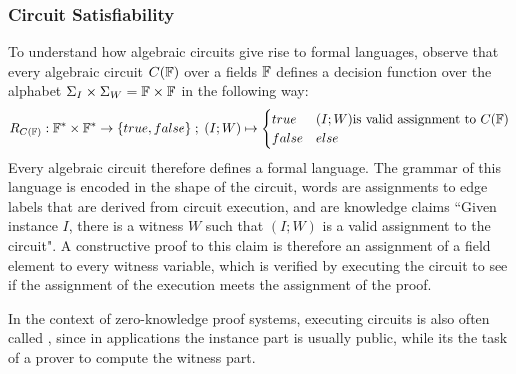 \subsubsection{Circuit Satisfiability}
\label{circuit-satisfiability} To understand how algebraic circuits give rise to formal languages, observe that every algebraic circuit $C(\mathbb{F})$ over a fields $\mathbb{F}$ defines a decision function over the alphabet $\Sigma_I \times \Sigma_W = \mathbb{F} \times \mathbb{F}$ in the following way:
\begin{equation}
R_{C(\mathbb{F})} : \mathbb{F}^* \times \mathbb{F}^* \to \{true, false\}\;;\;
(I;W) \mapsto
\begin{cases}
true & (I;W) \text{is valid assignment to } C(\mathbb{F})\\
false & else
\end{cases}
\end{equation}
Every algebraic circuit therefore defines a formal language. The grammar of this language is encoded in the shape of the circuit, words are assignments to edge labels that are derived from circuit execution, and  are knowledge claims ``Given instance $I$, there is a witness $W$ such that $(I;W)$ is a valid assignment to the circuit". A constructive proof to this claim is therefore an assignment of a field element to every witness variable, which is verified by executing the circuit to see if the assignment of the execution meets the assignment of the proof. 

In the context of zero-knowledge proof systems, executing circuits is also often called , since in applications the instance part is usually public, while its the task of a prover to compute the witness part.

